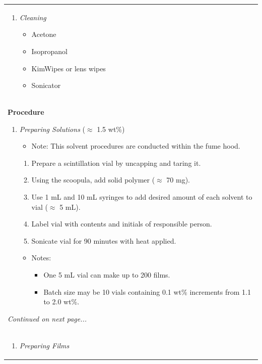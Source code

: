 \documentclass{article}
\begin{document}
\begin{center}
\begin{longtable}{ |p{\textwidth}| }
\begin{enumerate}[resume*=TF]
\end{enumerate}
\begin{enumerate}[resume*=TF]
	\item \textit{Cleaning}
	\begin{itemize}
		\item Acetone
		\item Isopropanol
		\item KimWipes or lens wipes
		\item Sonicator
	\end{itemize}
\end{enumerate}
\\
\textbf{Procedure}
\begin{enumerate}[series=TE]
	\item \textit{Preparing Solutions} ($\approx$ 1.5 wt\%)
	\begin{itemize}
		\item Note: This solvent procedures are conducted within the fume hood.
	\end{itemize} 
	\begin{enumerate}
		\item Prepare a scintillation vial by uncapping and taring it.
		\item Using the scoopula, add solid polymer ($\approx$ 70 mg).
		\item Use 1 mL and 10 mL syringes to add desired amount of each solvent to vial ($\approx$ 5 mL).
		\item Label vial with contents and initials of responsible person.
		\item Sonicate vial for 90 minutes with heat applied.
	\end{enumerate}
	\begin{itemize}
		\item Notes: 
		\begin{itemize}
			\item One 5 mL vial can make up to 200 films.
			\item Batch size may be 10 vials containing 0.1 wt\% increments from 1.1 to 2.0 wt\%.
		\end{itemize}  
	\end{itemize}
\end{enumerate}
\begin{center}
	\textit{Continued on next page...}
\end{center}
\\
\begin{enumerate}[resume*=TE]
	\item \textit{Preparing Films}

\end{enumerate}
\end{longtable}
\end{center}
\end{document}
